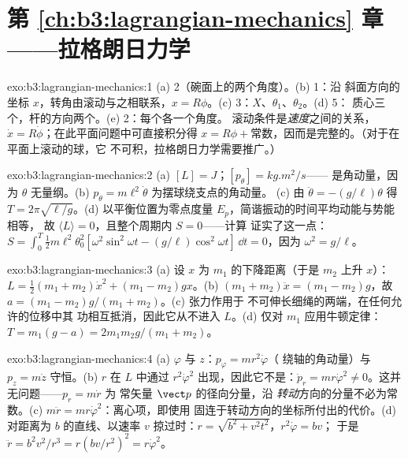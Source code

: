 \section*{第 \ref{ch:b3:lagrangian-mechanics} 章——拉格朗日力学}

\begin{solution}{exo:b3:lagrangian-mechanics:1}
(a) 2（碗面上的两个角度）。(b) 1：沿
斜面方向的坐标 $x$，转角由滚动与之相联系，$x =
R\phi$。(c) 3：$X$、$\theta_1$、$\theta_2$。(d) 5：
质心三个，杆的方向两个。(e) 2：每个各一个角度。
滚动条件是\emph{速度}之间的关系，$\dot x =
R\dot\phi$；在此平面问题中可直接积分得 $x = R\phi +
\text{常数}$，因而是完整的。（对于在平面上滚动的球，它
不可积，拉格朗日力学需要推广。）
\end{solution}

\begin{solution}{exo:b3:lagrangian-mechanics:2}
(a) $[L] = \unit{J}$；$[p_\theta] = \unit{kg.m^2/s}$——
是角动量，因为 $\theta$ 无量纲。(b) $p_\theta =
m\ell^2\dot\theta$ 为摆球绕支点的角动量。
(c) 由 $\ddot\theta = -(g/\ell)\theta$ 得 $T = 2\pi\sqrt{\ell/g}$。(d)
以平衡位置为零点度量 $E_p$，简谐振动的时间平均动能与势能相等，
故 $\langle
L\rangle = 0$，且整个周期内 $S = 0$——计算
证实了这一点：$S = \int_0^T\tfrac12 m\ell^2\theta_0^2[\omega^2\sin^2
\omega t - (g/\ell)\cos^2\omega t]\,\dd t = 0$，因为 $\omega^2 =
g/\ell$。
\end{solution}

\begin{solution}{exo:b3:lagrangian-mechanics:3}
(a) 设 $x$ 为 $m_1$ 的下降距离（于是 $m_2$ 上升 $x$）：$L =
\tfrac12(m_1 + m_2)\dot x^2 + (m_1 - m_2)gx$。(b) $(m_1 + m_2)\ddot x =
(m_1 - m_2)g$，故 $a = (m_1 - m_2)g/(m_1 + m_2)$。(c) 张力作用于
不可伸长细绳的两端，在任何允许的位移中其
功相互抵消，因此它从不进入 $L$。(d) 仅对 $m_1$ 应用牛顿定律：$T =
m_1(g - a) = 2m_1m_2g/(m_1 + m_2)$。
\end{solution}

\begin{solution}{exo:b3:lagrangian-mechanics:4}
(a) $\varphi$ 与 $z$：$p_\varphi = mr^2\dot\varphi$（
绕轴的角动量）与 $p_z = m\dot z$ 守恒。(b) $r$
在 $L$ 中通过 $r^2\dot\varphi^2$ 出现，因此它不是：$\dot p_r =
mr\dot\varphi^2 \neq 0$。这并无问题——$p_r = m\dot r$ 为
常矢量 $\vect p$ 的径向分量，沿
\emph{转动}方向的分量不必为常数。(c) $m\ddot r =
mr\dot\varphi^2$：离心项，即使用
固连于转动方向的坐标所付出的代价。(d) 对距离为 $b$
的直线、以速率 $v$ 掠过时：$r = \sqrt{b^2 + v^2t^2}$，$r^2\dot\varphi = bv$；
于是 $\ddot r = b^2v^2/r^3 = r(bv/r^2)^2 = r\dot\varphi^2$。
\end{solution}

